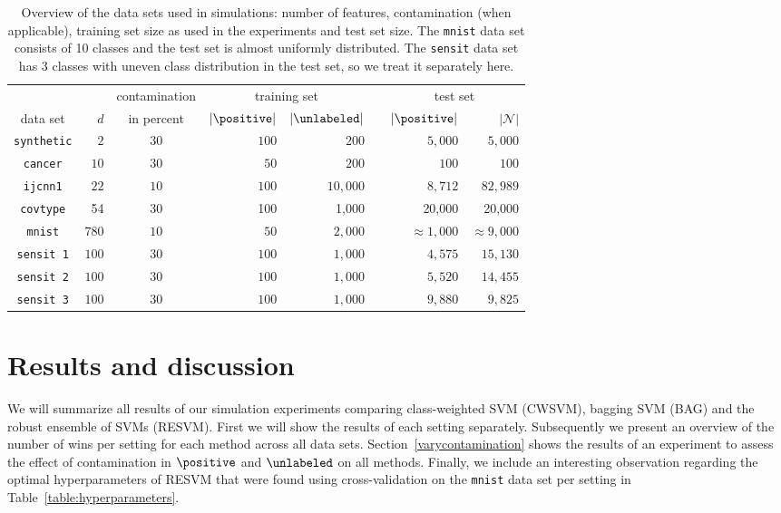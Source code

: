 \begin{table}[!ht]
\centering
\begin{tabular}{crcrrcrr}
\toprule
 & & contamination & \multicolumn{2}{c}{training set} & & \multicolumn{2}{c}{test set} \\ \cline{4-5} \cline{7-8}
data set & $d$ & in percent & $|\positive|$ & $|\unlabeled|$ & & $|\positive|$ & $|\mathcal{N}|$ \\
\midrule
\texttt{synthetic} & $2$ & $30$ & $100$ & $200$ & & $5,000$ & $5,000$ \\
\texttt{cancer} & $10$ & $30$   & $50$ & $200$ & & $100$ & $100$ \\
\texttt{ijcnn1} & $22$ & $10$   & $100$ & $10,000$ & & $8,712$ & $82,989$ \\
\texttt{covtype} & 54 & 30 & 100 & 1,000 & & 20,000 & 20,000 \\
\texttt{mnist} & $780$ & $10$   & $50$ & $2,000$ & & $\approx1,000$ & $\approx9,000$ \\
\texttt{sensit 1} & $100$ & $30$  & $100$ & $1,000$ & & $4,575$ & $15,130$ \\
\texttt{sensit 2} & $100$ & $30$  & $100$ & $1,000$ & & $5,520$ & $14,455$ \\
\texttt{sensit 3} & $100$ & $30$  & $100$ & $1,000$ & & $9,880$ & $9,825$ \\
\bottomrule
\end{tabular}
\caption{Overview of the data sets used in simulations: number of features, contamination (when applicable), training set size as used in the experiments and test set size. The \texttt{mnist} data set consists of 10 classes and the test set is almost uniformly distributed. The \texttt{sensit} data set has 3 classes with uneven class distribution in the test set, so we treat it separately here.}

\label{table:datasets}
\end{table}




\newpage
\section{Results and discussion}
We will summarize all results of our simulation experiments comparing class-weighted SVM (CWSVM), bagging SVM (BAG) and the robust ensemble of SVMs (RESVM). First we will show the results of each setting separately. Subsequently we present an overview of the number of wins per setting for each method across all data sets. Section~\ref{varycontamination} shows the results of an experiment to assess the effect of contamination in $\positive$ and $\unlabeled$ on all methods. Finally, we include an interesting observation regarding the optimal hyperparameters of RESVM that were found using cross-validation on the \texttt{mnist} data set per setting in Table~\ref{table:hyperparameters}.
